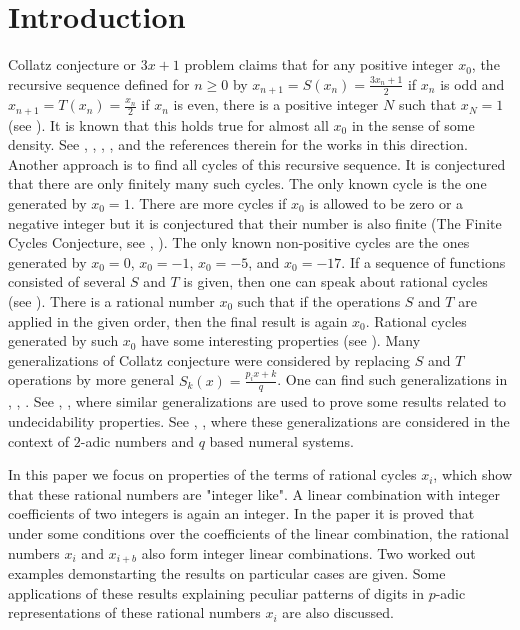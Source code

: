 \documentclass[12pt, twoside, leqno]{article}
\theoremstyle{definition}
\numberwithin{equation}{section}
\begin{document}
\section{Introduction} Collatz conjecture or $3x+1$ problem claims that for any positive integer $x_0$, the recursive sequence defined for $n\ge 0$ by $x_{n+1}=S(x_n)=\frac{3x_n+1}{2}$ if $x_n$ is odd and $x_{n+1}=T(x_n)=\frac{x_n}{2}$ if $x_n$ is even, there is a positive integer $N$ such that $x_N=1$ (see \cite{lag}). It is known that this holds true for almost all $x_0$ in the sense of some density. See \cite{terras}, \cite{ev}, \cite{kor}, \cite{tao}, and the references therein for the works in this direction. Another approach is to find all cycles of this recursive sequence. It is conjectured that there are only finitely many such cycles. The only known cycle is the one generated by $x_0=1$. There are more cycles if $x_0$ is allowed to be zero or a negative integer but it is conjectured that their number is also finite (The Finite Cycles Conjecture, see \cite{lag}, \cite{lag2}). The only known non-positive cycles are the ones generated by $x_0=0$, $x_0=-1$, $x_0=-5$, and $x_0=-17$. If a sequence of functions consisted of several $S$ and $T$ is given, then one can speak about rational cycles (see \cite{aliyev}). There is a rational number $x_0$ such that if the operations $S$ and $T$ are applied in the given order, then
the final result is again $x_0$. Rational cycles generated by such $x_0$ have some interesting properties (see \cite{lag2}). Many generalizations of Collatz conjecture were considered by replacing $S$ and $T$ operations by more general $S_k(x)=\frac{p_ix+k}{q}$. One can find such generalizations in \cite{matt}, \cite{matt2}, \cite{levy}. See \cite{con}, \cite{leht}, where similar generalizations are used to prove some results related to undecidability properties. See \cite{laar}, \cite{rouet}, where these generalizations are considered in the context of $2$-adic numbers and $q$ based numeral systems.

In this paper we focus on properties of the terms of rational cycles $x_i$, which show that these rational numbers are "integer like". A linear combination with integer coefficients of two integers is again an integer. In the paper it is proved that under some conditions over the coefficients of the linear combination, the rational numbers $x_i$ and $x_{i+b}$ also form integer linear combinations. Two worked out examples demonstarting the results on particular cases are given. Some applications of these results explaining peculiar patterns of digits in $p$-adic representations of these rational numbers $x_i$ are also discussed.
\end{document}
